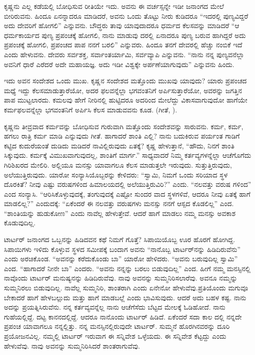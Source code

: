 ಕೃಷ್ಣನು ಎಲ್ಲ ಕಡೆಯಲ್ಲಿ ಬೋಧಿಸುವ ರೀತಿಯೇ ಇದು. ಅವನು ಈ ವರ್ಚಸ್ಸನ್ನೇ ಇಡೀ ಜನಾಂಗದ ಮೇಲೆ ಬೀರಿರುವನು. ಹಿಂದೂ ಏನನ್ನಾದರೂ ಮಾಡಿದರೆ, ಅವನು ಒಂದು ತೊಟ್ಟು ನೀರು ಕುಡಿದರೂ “ಇದರಲ್ಲಿ ಪುಣ್ಯವಿದ್ದರೆ ಅದು ದೇವರಿಗೆ ಹೋಗಲಿ” ಎನ್ನುವನು. ಬೌದ್ಧರು ತಾವು ಯಾವುದಾದರೂ ಧರ್ಮದ ಕೆಲಸವನ್ನು ಮಾಡಿದರೆ “ಆ ಧರ್ಮಕಾರ್ಯದ ಪುಣ್ಯ ಪ್ರಪಂಚಕ್ಕೆ ಹೋಗಲಿ, ನಾನು ಮಾಡುವು ದರಲ್ಲಿ ಏನಾದರೂ ಪುಣ್ಯ ಬರುವ ಹಾಗಿದ್ದರೆ ಅದು ಪ್ರಪಂಚಕ್ಕೆ ಹೋಗಲಿ, ಪ್ರಪಂಚದ ಪಾಪ ನನಗೆ ಬರಲಿ” ಎನ್ನುವರು. ಹಿಂದೂ ತನಗೆ ದೇವರಲ್ಲಿ ಹೆಚ್ಚು ನಂಬಿಕೆ ಇದೆ ಎಂದು ಹೇಳುವನು. ದೇವರು ಸರ್ವಶಕ್ತ, ಸರ್ವಾಂತರ್ಯಾಮಿ, ಸರ್ವವ್ಯಾಪಿ ಎನ್ನುವನು. “ನಾನು ನನ್ನ ಪುಣ್ಯವನೆಲ್ಲಾ ಅವನಿಗೆ ಧಾರೆ ಎರೆದರೆ ಅದೇ ಮಹಾಯಜ್ಞ. ಅದು ಇಡೀ ವಿಶ್ವಕ್ಕೇ ಅರ್ಪಣೆಯಾಗುವುದು” ಎನ್ನುವನು ಹಿಂದು.

ಇದು ಅವನ ಸಂದೇಶದ ಒಂದು ಮುಖ. ಕೃಷ್ಣನ ಸಂದೇಶದ ಮತ್ತೊಂದು ಮುಖವು ಯಾವುದು? ಯಾರು ಪ್ರಪಂಚದ ಮಧ್ಯೆ ಇದ್ದು ಕೆಲಸಮಾಡುತ್ತಾರೆಯೋ, ಅದರ ಫಲವನ್ನೆಲ್ಲಾ ಭಗವಂತನಿಗೆ ಅರ್ಪಿಸುತ್ತಾರೆಯೋ, ಅವರನ್ನು ಜಗತ್ತಿನ ಪಾಪ ಮುಟ್ಟಲಾರದು. ಕಮಲವು ಹೇಗೆ ನೀರಿನಲ್ಲಿ ಹುಟ್ಟಿದರೂ ಅದರಿಂದ ಮೇಲೆದ್ದು ವಿಕಾಸವಾಗುವುದೋ ಹಾಗೆಯೇ ಕರ್ಮಫಲವನ್ನೆಲ್ಲಾ ಭಗವಂತನಿಗೆ ಅರ್ಪಿಸಿ ಕೆಲಸ ಮಾಡುವವನು ಕೂಡ. (ಗೀತೆ, ).

ಕೃಷ್ಣನು ತೀವ್ರವಾದ ಕರ್ಮವನ್ನು ಬೋಧಿಸುವ ಗುರುವಾಗಿ ಮತ್ತೊಂದು ಸಂದೇಶವನ್ನು ಸಾರುವನು. ಕರ್ಮ, ಕರ್ಮ, ಹಗಲು ರಾತ್ರಿ ಕರ್ಮ ಮಾಡಿ ಎನ್ನುವುದು ಗೀತೆ. ಹಾಗಾದರೆ ಶಾಂತಿ ಎಲ್ಲಿ? ನಾನು ಬದುಕಿರುವ ಪರ್ಯಂತ ಗಾಡಿಗೆ ಕಟ್ಟಿದ ಕುದುರೆಯಂತೆ ದುಡಿದು ಮಡಿದರೆ ನಾವಿಲ್ಲಿರುವುದು ಏತಕ್ಕೆ? ಕೃಷ್ಣ ಹೇಳುತ್ತಾನೆ, “ಹೌದು, ನಿನಗೆ ಶಾಂತಿ ಸಿಕ್ಕುವುದು. ಕರ್ಮಕ್ಕೆ ವಿಮುಖವಾಗುವುದಲ್ಲ, ಶಾಂತಿಗೆ ಮಾರ್ಗ.” ಸಾಧ್ಯವಾದರೆ ನಿಮ್ಮ ಕರ್ತವ್ಯಗಳನ್ನೆಲ್ಲಾ ಆಚೆಗೊಗೆದು ಗಿರಿಶಿಖರದ ಮೇಲಿರಿ. ಅಲ್ಲಿಯೂ ಮನಸ್ಸು ಯಾವಾಗಲೂ ಕೆಲಸ ಮಾಡುತ್ತಲೇ ಇರುವುದು. ಸುತ್ತುತ್ತಿರುವುದು, ಅಲೆಯುತ್ತಿರುವುದು. ಯಾರೋ ಸಂನ್ಯಾಸಿಯೊಬ್ಬರನ್ನು ಕೇಳಿದರು: “ಸ್ವಾಮಿ, ನಿಮಗೆ ಒಂದು ಸರಿಯಾದ ಸ್ಥಳ ದೊರಕಿತೆ? ನೀವು ಎಷ್ಟು ವರುಷಗಳಿಂದ ಹಿಮಾಲಯದಲ್ಲಿ ಅಲೆಯುತ್ತಿರುವಿರಿ?” ಎಂದು. “ನಲವತ್ತು ವರುಷ ಗಳಿಂದ” ಎಂದ ಸಂನ್ಯಾಸಿ. “ಆರಿಸಿಕೊಳ್ಳುವುದಕ್ಕೆ, ತಂಗುವುದಕ್ಕೆ ಎಷ್ಟೋ ಸುಂದರ ವಾದ ಸ್ಥಳಗಳಿವೆ, ಆದರೂ ನೀವು ಏತಕ್ಕೆ ಹಾಗೆ ಮಾಡಲಿಲ್ಲ?” ಎಂದುದಕ್ಕೆ: “ಏಕೆಂದರೆ ಈ ನಲವತ್ತು ವರುಷಗಳು ಮನಸ್ಸು ನನಗೆ ಆಸ್ಪದ ಕೊಡಲಿಲ್ಲ” ಎಂದ. “ಶಾಂತಿಯನ್ನು ಹುಡುಕೋಣ” ಎಂದು ನಾವೆಲ್ಲ ಹೇಳುತ್ತೇವೆ. ಆದರೆ ಹಾಗೆ ಮಾಡಲು ನಮ್ಮ ಮನಸ್ಸು ಅವಕಾಶ ಕೊಡುವುದಿಲ್ಲ.

ಟಾರ್ಟರ್​ ಜನಾಂಗದ ಒಬ್ಬನನ್ನು ಹಿಡಿದವನ ಕಥೆ ನಿಮಗೆ ಗೊತ್ತೆ? ಸಿಪಾಯಿಯೊಬ್ಬ ಊರ ಹೊರಗೆ ಹೋಗಿದ್ದ. ಸಿಪಾಯಿಗಳು ಇಳಿದು ಕೊಳ್ಳುವ ಸ್ಥಳದ ಸಮೀಪಕ್ಕೆ ಬಂದಾಗ ಅವನು “ನಾನೊಬ್ಬ ಟಾರ್ಟರ್​ನನ್ನು ಹಿಡಿದಿರುವೆನು” ಎಂದು ಅರಚಿಕೊಂಡ. “ಅವನನ್ನು ಕರೆದುಕೊಂಡು ಬಾ” ಯಾರೋ ಹೇಳಿದರು. “ಅವನು ಬರುವುದಿಲ್ಲ ಸ್ವಾಮಿ” ಎಂದ. “ಹಾಗಾದರೆ ನೀನೇ ಬಾ” ಎಂದರು. “ಅವನು ನನ್ನನ್ನು ಬರಲು ಬಿಡುವುದಿಲ್ಲ” ಎಂದ. ಹೀಗೆ ನಮ್ಮ ಮನಸ್ಸಿನಲ್ಲಿ ನಾವೊಂದು ಟಾರ್ಟರ್​ ಮನುಷ್ಯನನ್ನು ಹಿಡಿದಿರುವೆವು. ನಾವು ಅವನನ್ನು ಸುಮ್ಮನಿರಿಸಲಾರೆವು. ಅವನೂ ನಮ್ಮನ್ನು ಸುಮ್ಮನಿರಲು ಬಿಡುವುದಿಲ್ಲ. ನಾವೆಲ್ಲ ಸುಮ್ಮನಿರಿ, ಶಾಂತರಾಗಿ ಎಂದು ಏನೇನೋ ಹೇಳುವೆವು.ಪ್ರತಿಯೊಂದು ಮಗುವೂ ಬೇಕಾದರೆ ಹಾಗೆ ಹೇಳಬಲ್ಲುದು ಮತ್ತು ಹಾಗೆ ಮಾಡಬಲ್ಲೆ ಎಂದು ಭಾವಿಸುವುದು. ಆದರೆ ಅದು ಬಹಳ ಕಷ್ಟ. ನಾನು ಅದನ್ನು ಪ್ರಯತ್ನಿಸಿರುವೆನು. ನನ್ನ ಕರ್ತವ್ಯವನ್ನೆಲ್ಲ ನಾನು ಆಚೆಗೆಸೆದು ಬೆಟ್ಟದ ಮೇಲಕ್ಕೆ ಓಡಿಹೋದೆ. ನಾನು ಗುಹೆಯಲ್ಲಿದ್ದೆ. ದಟ್ಟ ಕಾನನದಲ್ಲಿದ್ದೆ. ಆದರೂ ನಾನೊಂದು ಟಾರ್ಟರ್​ ಹಿಡಿದೆ. ಏಕೆಂದರೆ ಸದಾ ಕಾಲ ದಲ್ಲಿ ನನ್ನದೇ ಪ್ರಪಂಚ ಯಾವಾಗಲೂ ನನ್ನಲ್ಲಿತ್ತು. ನನ್ನ ಮನಸ್ಸಿನಲ್ಲಿರುವುದೇ ಟಾರ್ಟರ್​. ಸುಮ್ಮನೆ ಹೊರಗಿನವರನ್ನು ದೂರಿ ಪ್ರಯೋಜನವಿಲ್ಲ. ನಮ್ಮಲ್ಲಿ ಟಾರ್ಟರ್​ ಇರುವಾಗ ಈ ಸನ್ನಿವೇಶ ಒಳ್ಳೆಯದು. ಈ ಸನ್ನಿವೇಶ ಕೆಟ್ಟದ್ದು ಎಂದು ಹೇಳುವೆವು. ನಾವು ಅವನನ್ನು ಸುಮ್ಮನಿರಿಸಿದರೆ ಶಾಂತರಾಗುವೆವು.

